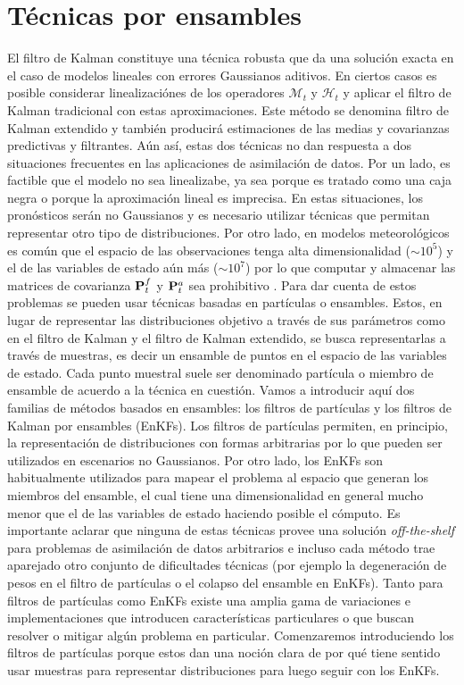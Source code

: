 \section{Técnicas por ensambles}
El filtro de Kalman constituye una técnica robusta que da una solución exacta en el caso de modelos lineales con errores Gaussianos aditivos. En ciertos casos es posible considerar linealizaciónes de los operadores $\mathcal{M}_t$ y $\mathcal{H}_t$ y aplicar el filtro de Kalman tradicional con estas aproximaciones. Este método se denomina filtro de Kalman extendido y también producirá estimaciones de las medias y covarianzas predictivas y filtrantes. Aún así, estas dos técnicas no dan respuesta a dos situaciones frecuentes en las aplicaciones de asimilación de datos. Por un lado, es factible que el modelo no sea linealizabe, ya sea porque es tratado como una caja negra o porque la aproximación lineal es imprecisa. En estas situaciones, los pronósticos serán no Gaussianos y es necesario utilizar técnicas que permitan representar otro tipo de distribuciones. Por otro lado, en modelos meteorológicos es común que el espacio de las observaciones tenga alta dimensionalidad ($\sim 10^5$) y el de las variables de estado aún más ($\sim 10^7$) por lo que computar y almacenar las matrices de covarianza $\mathbf{P}_t^f$ y $\mathbf{P}_t^a$ sea prohibitivo \citep{Katzfuss2016}. Para dar cuenta de estos problemas se pueden usar técnicas basadas en partículas o ensambles. Estos, en lugar de representar las distribuciones objetivo a través de sus parámetros como en el filtro de Kalman y el filtro de Kalman extendido, se busca representarlas a través de muestras, es decir un ensamble de puntos en el espacio de las variables de estado. Cada punto muestral suele ser denominado partícula o miembro de ensamble de acuerdo a la técnica en cuestión. Vamos a introducir aquí dos familias de métodos basados en ensambles: los filtros de partículas y los filtros de Kalman por ensambles (EnKFs). Los filtros de partículas permiten, en principio, la representación de distribuciones con formas arbitrarias por lo que pueden ser utilizados en escenarios no Gaussianos. Por otro lado, los EnKFs son habitualmente utilizados para mapear el problema al espacio que generan los miembros del ensamble, el cual tiene una dimensionalidad en general mucho menor que el de las variables de estado haciendo posible el cómputo. Es importante aclarar que ninguna de estas técnicas provee una solución \textit{off-the-shelf} para problemas de asimilación de datos arbitrarios e incluso cada método trae aparejado otro conjunto de dificultades técnicas (por ejemplo la degeneración de pesos en el filtro de partículas o el colapso del ensamble en EnKFs). Tanto para filtros de partículas como EnKFs existe una amplia gama de variaciones e implementaciones que introducen características particulares o que buscan resolver o mitigar algún problema en particular. Comenzaremos introduciendo los filtros de partículas porque estos dan una noción clara de por qué tiene sentido usar muestras para representar distribuciones para luego seguir con los EnKFs.


